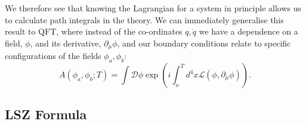 We therefore see that knowing the Lagrangian for a system in principle allows us to calculate path integrals in the theory. We can immediately generalise this result to QFT, where instead of the co-ordinates $q, \dot{q}$ we have a dependence on a field, $\phi$, and its derivative, $\partial_\mu \phi$, and our boundary conditions relate to specific configurations of the fields $\phi_a, \phi_b$:
\begin{equation}
A(\phi_a, \phi_b;T) = \int \mathcal{D}\phi \exp \left(i \int_o^T d^4 x \mathscr{L}(\phi, \partial_\mu \phi) \right).
\end{equation}

\subsection{LSZ Formula}

